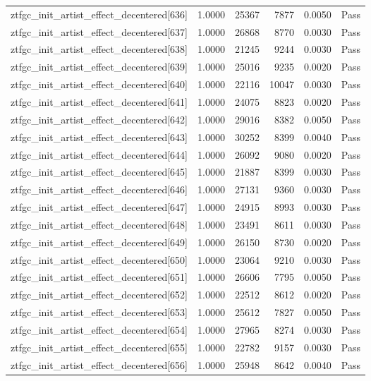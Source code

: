 \begin{table}[htbp]
\begin{tabular}{llrrll}
ztfgc\_init\_artist\_effect\_decentered[636] & 1.0000 & 25367 & 7877 & 0.0050 & Pass \\
ztfgc\_init\_artist\_effect\_decentered[637] & 1.0000 & 26868 & 8770 & 0.0030 & Pass \\
ztfgc\_init\_artist\_effect\_decentered[638] & 1.0000 & 21245 & 9244 & 0.0030 & Pass \\
ztfgc\_init\_artist\_effect\_decentered[639] & 1.0000 & 25016 & 9235 & 0.0020 & Pass \\
ztfgc\_init\_artist\_effect\_decentered[640] & 1.0000 & 22116 & 10047 & 0.0030 & Pass \\
ztfgc\_init\_artist\_effect\_decentered[641] & 1.0000 & 24075 & 8823 & 0.0020 & Pass \\
ztfgc\_init\_artist\_effect\_decentered[642] & 1.0000 & 29016 & 8382 & 0.0050 & Pass \\
ztfgc\_init\_artist\_effect\_decentered[643] & 1.0000 & 30252 & 8399 & 0.0040 & Pass \\
ztfgc\_init\_artist\_effect\_decentered[644] & 1.0000 & 26092 & 9080 & 0.0020 & Pass \\
ztfgc\_init\_artist\_effect\_decentered[645] & 1.0000 & 21887 & 8399 & 0.0030 & Pass \\
ztfgc\_init\_artist\_effect\_decentered[646] & 1.0000 & 27131 & 9360 & 0.0030 & Pass \\
ztfgc\_init\_artist\_effect\_decentered[647] & 1.0000 & 24915 & 8993 & 0.0030 & Pass \\
ztfgc\_init\_artist\_effect\_decentered[648] & 1.0000 & 23491 & 8611 & 0.0030 & Pass \\
ztfgc\_init\_artist\_effect\_decentered[649] & 1.0000 & 26150 & 8730 & 0.0020 & Pass \\
ztfgc\_init\_artist\_effect\_decentered[650] & 1.0000 & 23064 & 9210 & 0.0030 & Pass \\
ztfgc\_init\_artist\_effect\_decentered[651] & 1.0000 & 26606 & 7795 & 0.0050 & Pass \\
ztfgc\_init\_artist\_effect\_decentered[652] & 1.0000 & 22512 & 8612 & 0.0020 & Pass \\
ztfgc\_init\_artist\_effect\_decentered[653] & 1.0000 & 25612 & 7827 & 0.0050 & Pass \\
ztfgc\_init\_artist\_effect\_decentered[654] & 1.0000 & 27965 & 8274 & 0.0030 & Pass \\
ztfgc\_init\_artist\_effect\_decentered[655] & 1.0000 & 22782 & 9157 & 0.0030 & Pass \\
ztfgc\_init\_artist\_effect\_decentered[656] & 1.0000 & 25948 & 8642 & 0.0040 & Pass \\

\end{tabular}
\end{table}
